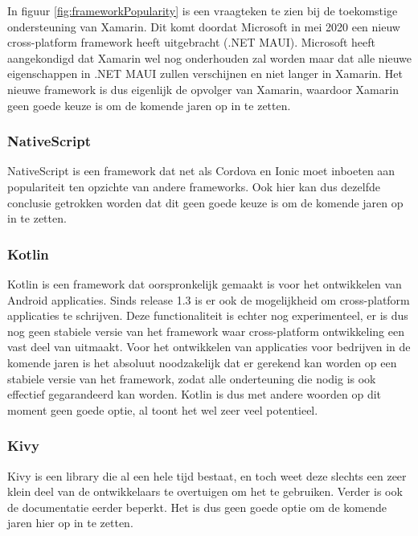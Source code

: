 In figuur \ref{fig:frameworkPopularity} is een vraagteken te zien bij de toekomstige ondersteuning van Xamarin. Dit komt doordat Microsoft in mei 2020 een nieuw cross-platform framework heeft uitgebracht (.NET MAUI). Microsoft heeft aangekondigd dat Xamarin wel nog onderhouden zal worden maar dat alle nieuwe eigenschappen in .NET MAUI zullen verschijnen en niet langer in Xamarin. Het nieuwe framework is dus eigenlijk de opvolger van Xamarin, waardoor Xamarin geen goede keuze is om de komende jaren op in te zetten.

\subsubsection{NativeScript}
\label{subsubsec:NativeScriptEisen}

NativeScript is een framework dat net als Cordova en Ionic moet inboeten aan populariteit ten opzichte van andere frameworks. Ook hier kan dus dezelfde conclusie getrokken worden dat dit geen goede keuze is om de komende jaren op in te zetten.

\subsubsection{Kotlin}
\label{subsubsec:KotlinEisen}

Kotlin is een framework dat oorspronkelijk gemaakt is voor het ontwikkelen van Android applicaties. Sinds release 1.3 is er ook de mogelijkheid om cross-platform applicaties te schrijven. Deze functionaliteit is echter nog experimenteel, er is dus nog geen stabiele versie van het framework waar cross-platform ontwikkeling een vast deel van uitmaakt. Voor het ontwikkelen van applicaties voor bedrijven in de komende jaren is het absoluut noodzakelijk dat er gerekend kan worden op een stabiele versie van het framework, zodat alle onderteuning die nodig is ook effectief gegarandeerd kan worden. Kotlin is dus met andere woorden op dit moment geen goede optie, al toont het wel zeer veel potentieel.

\subsubsection{Kivy}
\label{subsubsec:KivyEisen}

Kivy is een library die al een hele tijd bestaat, en toch weet deze slechts een zeer klein deel van de ontwikkelaars te overtuigen om het te gebruiken. Verder is ook de documentatie eerder beperkt. Het is dus geen goede optie om de komende jaren hier op in te zetten.


